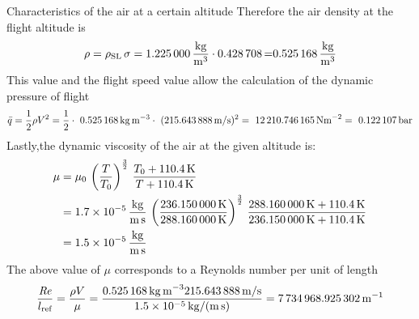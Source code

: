 \documentclass[[12pt,twoside]{book}
\begin{document}
\begin{myExampleX}{Characteristics of the air at a certain altitude}{}
Therefore the air density at the flight altitude is
\[
\rho = \rho_\text{SL} \, \sigma 
    = \SI[round-precision=3]{\myDensitysealevel}{\frac{kg}{m^{3}}} 
        \cdot \SI[round-precision=3]{\myRelativedensity} 
    = \SI[round-precision=3]{\myDensity}{\frac{kg}{m^{3}}}
\]
%
This value and the flight speed value allow the calculation of the dynamic pressure of flight
\[
\bar{q}=\frac{1}{2} \rho V^{2} =\frac{1}{2}\cdot\ \SI[round-precision=3]{\myDensity}{kg~m^{-3}} \cdot\ (\SI[round-precision=2]{\mySpeedMs}{m/s})^{2} =~\SI[round-precision=2]{\myDynamicpressureNm}{N m^{-2}}=~\SI[round-precision=3]{\myDynamicpressureBar}{bar}
\]
Lastly,the dynamic viscosity of the air at the given  altitude is:
\[
\begin{split}
\mu & {}= \mu_0 \, \left(\frac{T}{T_0}\right)^{\frac{3}{2}} \,                 \frac {T_0 + \SI{110.4}{K}}{T + \SI{110.4}{K}}
    \\
     & {}=\SI[round-precision=1,scientific-notation=true]{\myCone}  {\si {\frac{kg}{m\,s}}}\, \left(\frac{\SI[round-precision=2]{\myTemperatureK}{K}}  {\SI[round-precision=2]{\myTemperaturesealevelK}{K}}
     \right)^{\frac{3}{2}} \,  \frac{\SI[round-precision=2]{\myTemperaturesealevelK}{K} + \SI{110.4}{K}}{\SI[round-precision=2]{\myTemperatureK}{K} + \SI{110.4}{K}}
     \\
     & {}= \SI[round-precision=1,scientific-notation=true]{
     \myDynamicviscosity } {\si {\frac{kg}{m\,s}}}
\end{split}
\]
The above value of $\mu$ corresponds to a Reynolds number per unit of length
\[
 \frac{\text{\itshape{Re}}}{l_\text{ref}} 
   = \frac{\rho V}{\mu}
   = \frac{
     \SI[round-precision=3]{\myDensity}{kg\,m^{-3}}
       \SI[round-precision=2]{\mySpeedMs}{m/s}
       }{
         \SI[round-precision=2,scientific-notation=true]{\myDynamicviscosity}{kg/(m\,s)}
       }
 = \SI[round-precision=0]{\myReynoldsnumeberperunitoflenght}{m^{-1}}
\]

\end{myExampleX}
\end{document}
